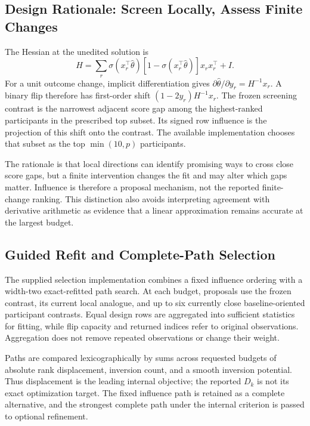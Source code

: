 \documentclass{article}
\begin{document}
\subsection{Design Rationale: Screen Locally, Assess Finite Changes}
The Hessian at the unedited solution is
\begin{equation}
 H=\sum_r\sigma(x_r^\top\hat\theta)
       [1-\sigma(x_r^\top\hat\theta)]x_rx_r^\top+I.
\end{equation}
For a unit outcome change, implicit differentiation gives $\partial\hat\theta/\partial y_r=H^{-1}x_r$. A binary flip therefore has first-order shift $(1-2y_r)H^{-1}x_r$. The frozen screening contrast is the narrowest adjacent score gap among the highest-ranked participants in the prescribed top subset. Its signed row influence is the projection of this shift onto the contrast. The available implementation chooses that subset as the top $\min(10,p)$ participants.

The rationale is that local directions can identify promising ways to cross close score gaps, but a finite intervention changes the fit and may alter which gaps matter. Influence is therefore a proposal mechanism, not the reported finite-change ranking. This distinction also avoids interpreting agreement with derivative arithmetic as evidence that a linear approximation remains accurate at the largest budget.

\subsection{Guided Refit and Complete-Path Selection}
The supplied selection implementation combines a fixed influence ordering with a width-two exact-refitted path search. At each budget, proposals use the frozen contrast, its current local analogue, and up to six currently close baseline-oriented participant contrasts. Equal design rows are aggregated into sufficient statistics for fitting, while flip capacity and returned indices refer to original observations. Aggregation does not remove repeated observations or change their weight.

Paths are compared lexicographically by sums across requested budgets of absolute rank displacement, inversion count, and a smooth inversion potential. Thus displacement is the leading internal objective; the reported $D_k$ is not its exact optimization target. The fixed influence path is retained as a complete alternative, and the strongest complete path under the internal criterion is passed to optional refinement.
\end{document}
